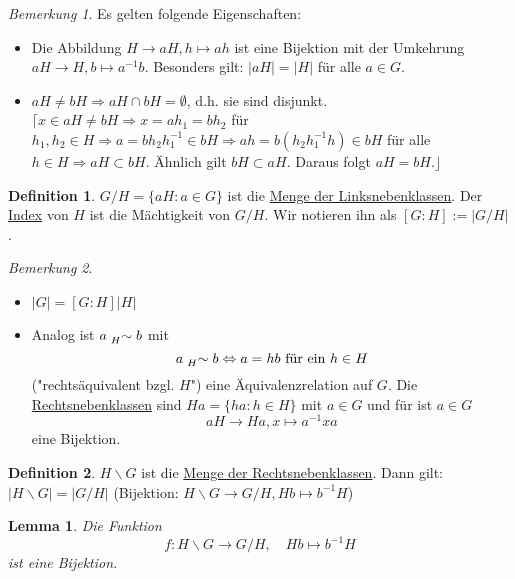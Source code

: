 \documentclass[12pt]{scrartcl} %
\newtheorem{lemma}{Lemma}
\theoremstyle{definition}
\newtheorem*{defn}{Definition}
\theoremstyle{remark}
\newtheorem*{nb}{Bemerkung}
\newcommand{\defi}{\underline}
\begin{document}
\begin{nb}
	Es gelten folgende Eigenschaften: 
	\begin{itemize}
	\item Die Abbildung $H \to aH, h \mapsto ah$ ist eine Bijektion mit der Umkehrung $aH \to H, b \mapsto a^{-1}b$.
		Besonders gilt: $\vert aH \vert = \vert H \vert$ für alle $a \in G$.
	\item $aH \neq bH \Rightarrow aH \cap bH = \emptyset$, d.h. sie sind disjunkt. \newline $\lceil x \in aH \neq bH \Rightarrow x = ah_{1} = bh_{2}$ für $h_{1},h_{2} \in H \Rightarrow a=bh_{2}h_{1}^{-1} \in bH \Rightarrow ah= b(h_{2}h_{1}^{-1}h) \in bH$ für alle $h \in H \Rightarrow aH \subset bH$. Ähnlich gilt $bH \subset aH$.
		Daraus folgt $aH=bH.\rfloor$ %
	\end{itemize}
\end{nb}

\begin{defn}
	$G/H = \lbrace aH : a \in G \rbrace$ ist die \defi{Menge der Linksnebenklassen}.
	Der \defi{Index} von $H$ ist die Mächtigkeit von $G/H$.
	Wir notieren ihn als \([G:H] := |G/H|\).
\end{defn}

\begin{nb}
	\begin{itemize}
 	\item $\vert G \vert = [G:H]\vert H\vert$
 	\item Analog ist $a \mathrel{\prescript{}{H}{\sim}} b$ mit \[a \mathrel{\prescript{}{H}{\sim}} b \Leftrightarrow \text{\(a=hb\) für ein \(h \in H\)}\] ("rechtsäquivalent bzgl. \(H\)") eine Äquivalenzrelation auf \(G\).
		Die \underline{Rechtsnebenklassen} sind $Ha=\lbrace ha : h \in H\rbrace$ mit $a \in G$ und für ist $a \in G$ \[aH \rightarrow Ha, x \mapsto a^{-1}xa\] eine Bijektion.
	\end{itemize}
\end{nb}

\begin{defn}
	$H \backslash G$ ist die \underline{Menge der Rechtsnebenklassen}. Dann gilt: $\vert H \backslash G \vert = \vert G/H \vert$
	(Bijektion: $H \backslash G \rightarrow G/H, Hb \mapsto b^{-1}H$)
\end{defn}

\begin{lemma} 
	Die Funktion $$f: H\backslash G \to G/H, \quad Hb \mapsto b^{-1}H$$ ist eine Bijektion.
\end{lemma}
\end{document}
